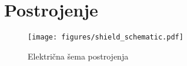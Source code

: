 \newpage
\section{Postrojenje}

\begin{figure}[h]
\centering
\texttt{[image: figures/shield\_schematic.pdf]}
\caption{Električna šema postrojenja}
\end{figure}
